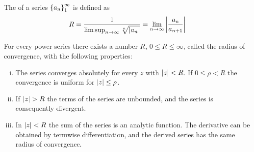 \begin{definition}
    The  of a series $\left\{ a_n \right\}_1^\infty$ is
    defined as
    \begin{align*}
        R = \frac{1}{\limsup_{n \rightarrow \infty} \sqrt[n]{\left\vert a_n \right\vert}}
        = \lim\limits_{n \rightarrow \infty} \left\vert \frac{a_n}{a_{n+1}} \right\vert
    \end{align*}
\end{definition}

\begin{theorem}[Abel]
    For every power series there exists a number $R$, $0 \leq R \leq \infty$, called
    the radius of convergence, with the following properties:
    \begin{enumerate}[(i)]
        \item The series converges absolutely for every $z$ with $\left\vert z \right\vert < R$. If
            $0 \leq \rho < R$ the convergence is uniform for $\left\vert z \right\vert \leq \rho$.
        \item If $\left\vert z \right\vert > R$ the terms of the series are unbounded, and the series
            is consequently divergent.
        \item In $\left\vert z \right\vert < R$ the sum of the series is an analytic function. The
            derivative can be obtained by termwise differentiation, and the derived
            series has the same radius of convergence.
    \end{enumerate}
\end{theorem}

